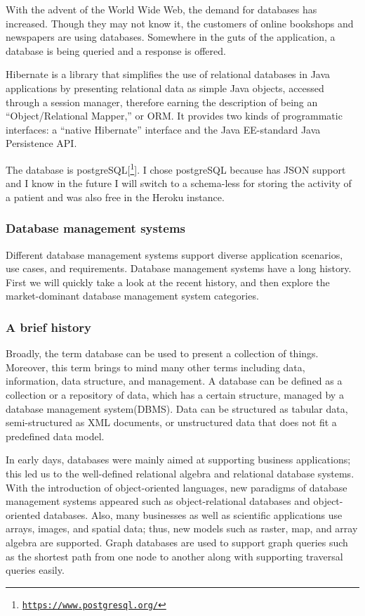 With the advent of the World Wide Web, the demand for databases has increased. Though they may not know it, the customers of online bookshops and newspapers are using databases. Somewhere in the guts of the application, a database is being queried and a response is offered.  
\newline

Hibernate is a library that simplifies the use of relational databases in Java applications by presenting relational data as simple Java objects, accessed through a session manager, therefore earning the description of being an “Object/Relational Mapper,” or ORM. It provides two kinds of programmatic interfaces: a “native Hibernate” interface and the Java EE-standard Java Persistence API.  
\newline


The database is postgreSQL[\footnote{\href{https://www.postgresql.org/}{\texttt{https://www.postgresql.org/}}}]. I chose postgreSQL because has JSON support and I know in the future I will switch to a schema-less for storing the activity of a patient and was also free in the Heroku instance.

\subsubsection*{Database management systems}
Different database management systems support diverse application scenarios, use cases, and requirements. Database management systems have a long history. First we will quickly take a look at the recent history, and then explore the market-dominant database management system categories.
\newline

\subsubsection*{A brief history}
Broadly, the term database can be used to present a collection of things. Moreover, this term brings to mind many other terms including data, information, data structure, and management. A database can be defined as a collection or a repository of data, which has a certain structure, managed by a database management system(DBMS). Data can be structured as tabular data, semi-structured as XML documents, or unstructured data that does not fit a predefined data model.
\newline

In early days, databases were mainly aimed at supporting business applications; this led us to the well-defined relational algebra and relational database systems. With the introduction of object-oriented languages, new paradigms of database management systems appeared such as object-relational databases and object-oriented databases. Also, many businesses as well as scientific applications use arrays, images, and spatial data; thus, new models such as raster, map, and array algebra are supported. Graph databases are used to support graph queries such as the shortest path from one node to another along with supporting traversal queries easily.
\newline

